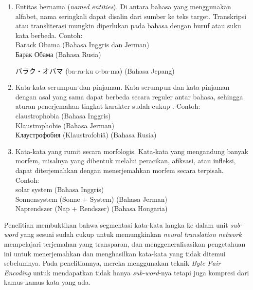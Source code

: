     \begin{enumerate}
        \item Entitas bernama (\textit{named entities}). Di antara bahasa yang menggunakan alfabet, nama seringkali dapat disalin dari sumber ke teks target. Transkripsi atau transliterasi mungkin diperlukan pada bahasa dengan huruf atau suku kata berbeda. Contoh: \\
        Barack Obama (Bahasa Inggris dan Jerman) \\
        \foreignlanguage{russian}{Барак Обама} (Bahasa Rusia) \\
        \begin{CJK}{UTF8}{min}
        バラク・オバマ (ba-ra-ku o-ba-ma) (Bahasa Jepang)
        \end{CJK}

        \item Kata-kata serumpun dan pinjaman. Kata serumpun dan kata pinjaman dengan asal yang sama dapat berbeda secara reguler antar bahasa, sehingga aturan penerjemahan tingkat karakter sudah cukup \parencite{Tiedemann2012}. Contoh:  \\
        claustrophobia (Bahasa Inggris) \\
        Klaustrophobie (Bahasa Jerman) \\
        \foreignlanguage{russian}{Клаустрофобия} (Klaustrofobiâ) (Bahasa Rusia)

        \item Kata-kata yang rumit secara morfologis. Kata-kata yang mengandung banyak morfem, misalnya yang dibentuk melalui peracikan, afiksasi, atau infleksi, dapat diterjemahkan dengan menerjemahkan morfem secara terpisah. Contoh:  \\
        solar system (Bahasa Inggris) \\
        Sonnensystem (Sonne + System) (Bahasa Jerman) \\
        Naprendszer (Nap + Rendszer) (Bahasa Hongaria)
    \end{enumerate}

    Penelitian \parencite{Sennrich_Haddow_Birch_2016} membuktikan bahwa segmentasi kata-kata langka ke dalam unit \textit{sub-word} yang sesuai sudah cukup untuk memungkinkan \textit{neural translation network} mempelajari terjemahan yang transparan, dan menggeneralisasikan pengetahuan ini untuk menerjemahkan dan menghasilkan kata-kata yang tidak ditemui sebelumnya. Pada penelitiannya, mereka menggunakan teknik \textit{Byte Pair Encoding} untuk mendapatkan tidak hanya \textit{sub-word}-nya tetapi juga kompresi dari kamus-kamus kata yang ada.

